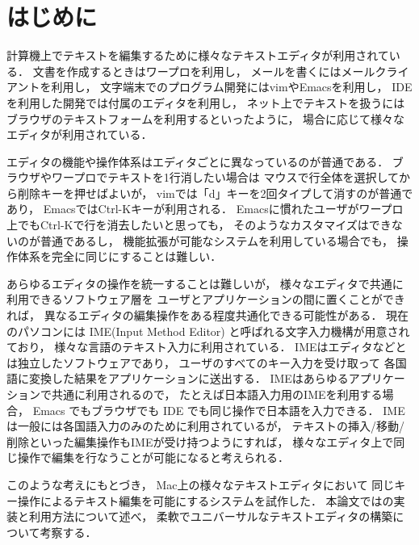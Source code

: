 \section{はじめに}

計算機上でテキストを編集するために様々なテキストエディタが利用されている．
文書を作成するときはワープロを利用し，
メールを書くにはメールクライアントを利用し，
文字端末でのプログラム開発にはvimやEmacsを利用し，
IDEを利用した開発では付属のエディタを利用し，
ネット上でテキストを扱うにはブラウザのテキストフォームを利用するといったように，
場合に応じて様々なエディタが利用されている．

エディタの機能や操作体系はエディタごとに異なっているのが普通である．
ブラウザやワープロでテキストを1行消したい場合は
マウスで行全体を選択してから削除キーを押せばよいが，
vimでは「d」キーを2回タイプして消すのが普通であり，
EmacsではCtrl-Kキーが利用される．
Emacsに慣れたユーザがワープロ上でもCtrl-Kで行を消去したいと思っても，
そのようなカスタマイズはできないのが普通であるし，
機能拡張が可能なシステムを利用している場合でも，
操作体系を完全に同じにすることは難しい．

あらゆるエディタの操作を統一することは難しいが，
様々なエディタで共通に利用できるソフトウェア層を
ユーザとアプリケーションの間に置くことができれば，
異なるエディタの編集操作をある程度共通化できる可能性がある．
%
現在のパソコンには IME(Input Method Editor) と呼ばれる文字入力機構が用意されており，
様々な言語のテキスト入力に利用されている．
IMEはエディタなどとは独立したソフトウェアであり，
ユーザのすべてのキー入力を受け取って
各国語に変換した結果をアプリケーションに送出する．
IMEはあらゆるアプリケーションで共通に利用されるので，
たとえば日本語入力用のIMEを利用する場合，
Emacs でもブラウザでも IDE でも同じ操作で日本語を入力できる．
IMEは一般には各国語入力のみのために利用されているが，
テキストの挿入/移動/削除といった編集操作もIMEが受け持つようにすれば，
様々なエディタ上で同じ操作で編集を行なうことが可能になると考えられる．

このような考えにもとづき，
Mac上の様々なテキストエディタにおいて
同じキー操作によるテキスト編集を可能にする{\system}システムを試作した．
本論文では{\system}の実装と利用方法について述べ，
柔軟でユニバーサルなテキストエディタの構築について考察する．
